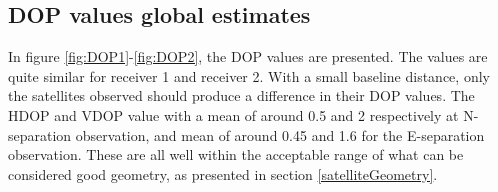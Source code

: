 \subsection{DOP values global estimates} 
In figure \ref{fig:DOP1}-\ref{fig:DOP2}, the DOP values are presented. The values are quite similar for receiver 1 and receiver 2. With a small baseline distance, only the satellites observed should produce a difference in their DOP values. The HDOP and VDOP value with a mean of around 0.5 and 2 respectively at N-separation observation, and mean of around 0.45 and 1.6 for the E-separation observation. These are all well within the acceptable range of what can be considered good geometry, as presented in section \ref{satelliteGeometry}.

